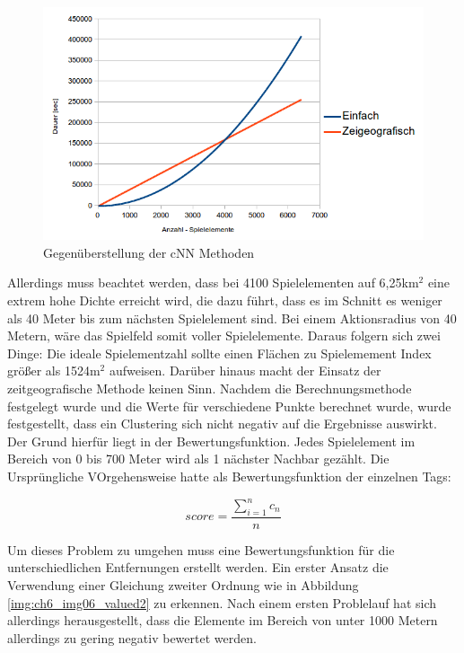 \begin{figure}[H]
\begin{center}
\includegraphics[width=150mm]{images/ch6_img05_eval_match.png}
\caption{Gegenüberstellung der cNN Methoden}
\label{img:ch6_img05_eval_match}
\end{center}
\end{figure}

Allerdings muss beachtet werden, dass bei 4100 Spielelementen auf 6,25km$^2$ eine extrem hohe Dichte erreicht wird, die dazu führt, dass es im Schnitt es weniger als 40 Meter bis zum nächsten Spielelement sind. Bei einem Aktionsradius von 40 Metern, wäre das Spielfeld somit voller Spielelemente. Daraus folgern sich zwei Dinge:
Die ideale Spielementzahl sollte einen Flächen zu Spielemement Index größer als 1524m$^2$ aufweisen.
Darüber hinaus macht der Einsatz der zeitgeografische Methode keinen Sinn.
Nachdem die Berechnungsmethode festgelegt wurde und die Werte für verschiedene Punkte berechnet wurde, wurde festgestellt, dass ein Clustering sich nicht negativ auf die Ergebnisse auswirkt.
Der Grund hierfür liegt in der Bewertungsfunktion. Jedes Spielelement im Bereich von 0 bis 700 Meter wird als 1 nächster Nachbar gezählt.
Die Ursprüngliche VOrgehensweise hatte als Bewertungsfunktion der einzelnen Tags:

\begin{equation}
score = \frac{ \sum\limits_{i=1}^n c_n }{n}
\end{equation}

Um dieses Problem zu umgehen muss eine Bewertungsfunktion für die unterschiedlichen Entfernungen erstellt werden. Ein erster Ansatz die Verwendung einer Gleichung zweiter Ordnung wie in Abbildung \ref{img:ch6_img06_valued2} zu erkennen. Nach einem ersten Problelauf hat sich allerdings herausgestellt, dass die Elemente im Bereich von unter 1000 Metern allerdings zu gering negativ bewertet werden.


